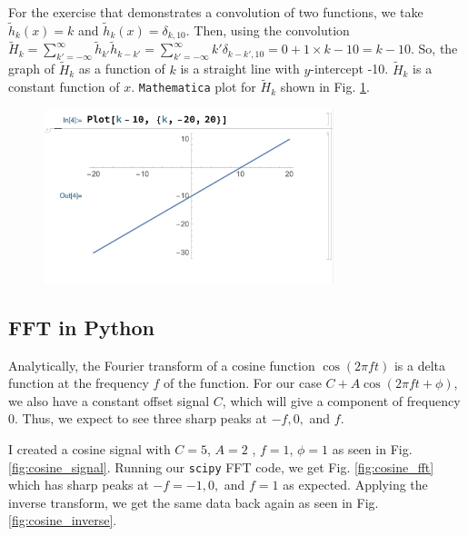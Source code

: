 \documentclass{article}
\begin{document}
For the exercise that demonstrates a convolution of two functions, we take $\widetilde{h}_{k}(x) = k$ and $\widetilde{h}_{k}(x) =\delta_{k, 10}$. Then, using the convolution $\widetilde{H}_{k} = \sum_{k'=-\infty}^{\infty} \widetilde{h}_{k'} \widetilde{h}_{k - k'} = \sum_{k'=-\infty}^{\infty} k' \delta_{k-k',10} = 0 + 1\times k-10 = k-10$. So, the graph of $\widetilde{H}_{k}$ as a function of $k$ is a straight line with $y$-intercept -10. $\widetilde{H}_{k}$ is a constant function of $x$. \texttt{Mathematica} plot for $\widetilde{H}_{k}$ shown in Fig. \ref{fig:convolution}.

\begin{figure}[h!]
\centering
\includegraphics[width=0.75\textwidth]{plots/convolution.png}
\caption{\label{fig:convolution}  }
\end{figure}

\subsection{FFT in Python}

Analytically, the Fourier transform of a cosine function $\cos(2\pi f t)$ is a delta function at the frequency $f$ of the function. For our case $C+A\cos(2\pi f t + \phi)$, we also have a constant offset signal $C$, which will give a component of frequency 0. Thus, we expect to see three sharp peaks at $-f, 0,$ and $f$.

I created a cosine signal with $C = 5$, $A = 2$ , $f = 1$, $\phi = 1$ as seen in Fig. \ref{fig:cosine_signal}. Running our \texttt{scipy} FFT code, we get Fig. \ref{fig:cosine_fft} which has sharp peaks at $-f = -1, 0,$ and $f = 1$ as expected. Applying the inverse transform, we get the same data back again as seen in Fig. \ref{fig:cosine_inverse}.
\end{document}
